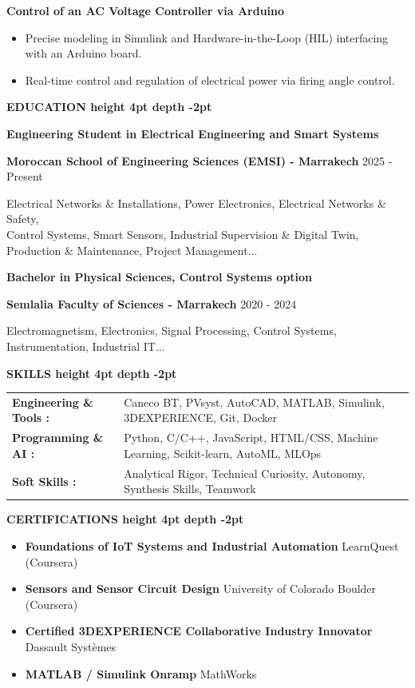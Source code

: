 \documentclass[10pt,a4paper]{altacv}
\renewcommand{\cvsection}[2][]{%
  \vspace{3pt}%
  {\color{heading}\LARGE\bfseries #2 \hspace{0.2em}\leaders\vrule height 4pt depth -2pt\hfill\mbox{}}\par\vspace{2pt}
}
\renewcommand{\cvevent}[4]{%
  {\large\bfseries\color{accent}#1\par}
  \smallskip\normalsize
  \ifstrequal{#2}{}{}{%
    \textbf{\color{emphasis}#2\ifstrequal{#4}{}{}{ - #4}}%
  }%
  \hfill
  \ifstrequal{#3}{}{}{{\small#3}}%
  \par\smallskip
}
\begin{document}
{\large\bfseries\color{accent} Control of an AC Voltage Controller via Arduino}\\[0.05cm]
\begin{itemize}
  \item Precise modeling in Simulink and Hardware-in-the-Loop (HIL) interfacing with an Arduino board.
  \item Real-time control and regulation of electrical power via firing angle control.
\end{itemize}

\cvsection{EDUCATION}
\cvevent{Engineering Student in Electrical Engineering and Smart Systems}{Moroccan School of Engineering Sciences (EMSI)}{2025 - Present}{Marrakech}
\small Electrical Networks \& Installations, Power Electronics, Electrical Networks \& Safety,\\
\small Control Systems, Smart Sensors, Industrial Supervision \& Digital Twin, Production \& Maintenance, Project Management...

\cvevent{Bachelor in Physical Sciences, Control Systems option}{Semlalia Faculty of Sciences}{2020 - 2024}{Marrakech}
\small Electromagnetism, Electronics, Signal Processing, Control Systems, Instrumentation, Industrial IT...

\cvsection{SKILLS}
\begin{tabular}{@{}ll@{}}
\textbf{Engineering \& Tools :} & Caneco BT, PVsyst, AutoCAD, MATLAB, Simulink, 3DEXPERIENCE, Git, Docker \\[2pt]
\textbf{Programming \& AI :} & Python, C/C++, JavaScript, HTML/CSS, Machine Learning, Scikit-learn, AutoML, MLOps \\[2pt]
\textbf{Soft Skills :} & Analytical Rigor, Technical Curiosity, Autonomy, Synthesis Skills, Teamwork \\
\end{tabular}

\cvsection{CERTIFICATIONS}
\begin{itemize}[leftmargin=*, label=\textbullet, itemsep=2pt]
  \item \textbf{Foundations of IoT Systems and Industrial Automation} \hfill {\color{emphasis}LearnQuest (Coursera)}
  \item \textbf{Sensors and Sensor Circuit Design} \hfill {\color{emphasis}University of Colorado Boulder (Coursera)}
  \item \textbf{Certified 3DEXPERIENCE Collaborative Industry Innovator} \hfill {\color{emphasis}Dassault Systèmes}
  \item \textbf{MATLAB / Simulink Onramp} \hfill {\color{emphasis}MathWorks}
\end{itemize}
\end{document}
